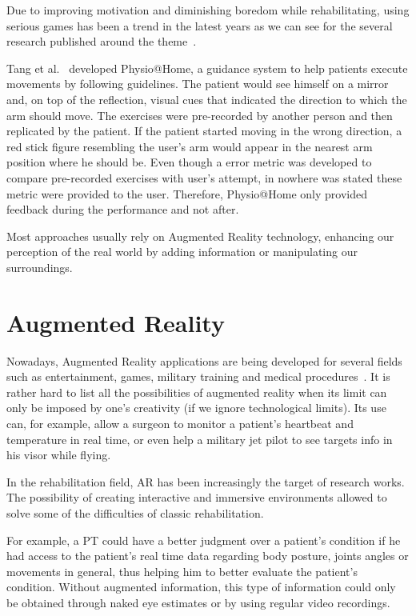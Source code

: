 Due to improving motivation and diminishing boredom while rehabilitating, using serious games
has been a trend in the latest years as we can see for the several 
research published around the theme~\cite{Schonauer2011c, Ma2008, Burke2009, Borghese2013, Lange2012}. 

Tang et al.~\cite{Tang2014a} developed Physio@Home, a guidance system to help patients execute movements by following
guidelines. The patient would see himself on a mirror and, on top of the reflection, visual cues that 
indicated the direction to which the arm should move. The exercises were pre-recorded by another person and 
then replicated by the patient. If the patient started moving in the wrong direction, a red stick figure resembling the user's arm would appear in the nearest arm position where he should be.
Even though a error metric was developed to compare pre-recorded exercises with user's attempt, in nowhere was stated these metric were provided to the user. Therefore, Physio@Home only provided feedback during the performance and not after.


Most approaches usually rely on Augmented Reality technology, enhancing our perception of the real world
by adding information or manipulating our surroundings.  

\section{Augmented Reality}
\label{RW-AR}

Nowadays, Augmented Reality applications 
are being developed for several fields such as entertainment, games, military training 
and medical procedures~\cite{Guimaraes2014a, Rego2010}. 
It is rather hard to list all the possibilities of augmented reality when its limit can only be imposed by one's creativity (if we ignore technological limits).
Its use can, for example, allow a surgeon to monitor a patient's heartbeat 
and temperature in real time, or even help a military jet pilot to see targets info in his visor while flying.

In the rehabilitation field, \ac{AR} has been increasingly the target of research works.
The possibility of creating interactive and immersive environments
allowed to solve some of the difficulties of classic rehabilitation.

For example, a PT could have a better judgment over a patient's condition if he 
had access to the patient's real time data regarding body posture, joints angles or movements in general, thus helping him to better evaluate the patient's condition. 
Without augmented information, this type of information could only be obtained through naked eye 
estimates or by using regular video recordings.

